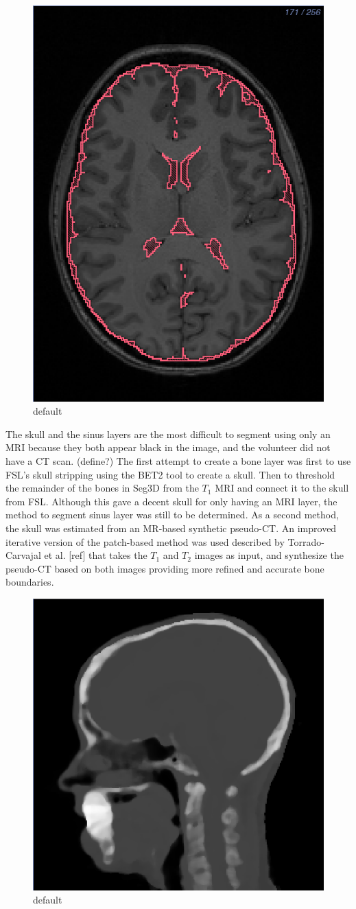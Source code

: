 \begin{figure}[H]
\begin{center}
\includegraphics[width=.49\textwidth]{Figures/CSF_seg}
\caption{default}
\label{default}
\end{center}
\end{figure}

The skull and the sinus layers are the most difficult to segment using only an MRI because they both appear black in the image, and the volunteer did not have a CT scan. (define?) The first attempt to create a bone layer was first to use FSL's skull stripping using the BET2 tool to create a skull. Then to threshold the remainder of the bones in Seg3D from the $T_1$ MRI and connect it to the skull from FSL. Although this gave a decent skull for only having an MRI layer, the method to segment sinus layer was still to be determined. As a second method, the skull was estimated from an MR-based synthetic pseudo-CT. An improved iterative version of the patch-based method was used described by Torrado-Carvajal et al. [ref] that takes the $T_1$ and $T_2$ images as input, and synthesize the pseudo-CT based on both images providing more refined and accurate bone boundaries. 

\begin{figure}[H]
\begin{center}
\includegraphics[width=.49\textwidth]{Figures/pseudo_CT}
\caption{default}
\label{default}
\end{center}
\end{figure}

